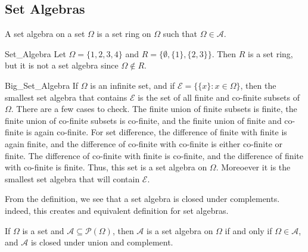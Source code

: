             \subsection{Set Algebras}
                \begin{definition}
                    A set algebra on a set $\Omega$ is a set ring
                    on $\Omega$ such that $\Omega\in\mathcal{A}$.
                \end{definition}
                \begin{lexample}{}{Set_Algebra}
                    Let $\Omega=\{1,2,3,4\}$ and
                    $R=\{\emptyset,\{1\},\{2,3\}\}$. Then $R$
                    is a set ring, but it is not a set algebra
                    since $\Omega\notin{R}$.
                \end{lexample}
                \begin{lexample}{}{Big_Set_Algebra}
                    If $\Omega$ is an infinite set, and if
                    $\mathcal{E}=\big\{\{x\}:x\in\Omega\big\}$, then
                    the smallest set algebra that contains $\mathcal{E}$
                    is the set of all finite and co-finite subsets of
                    $\Omega$. There are a few cases to check. The finite
                    union of finite subsets is finite, the finite union of
                    co-finite subsets is co-finite, and the finite union
                    of finite and co-finite is again co-finite. For set
                    difference, the difference of finite with finite is
                    again finite, and the difference of co-finite with
                    co-finite is either co-finite or finite. The
                    difference of co-finite with finite is co-finite,
                    and the difference of finite with co-finite is finite.
                    Thus, this set is a set algebra on $\Omega$. Moreoever
                    it is the smallest set algebra that will contain $\mathcal{E}$.
                \end{lexample}
                From the definition, we see that a set algebra
                is closed under complements. indeed, this creates
                and equivalent definition for set algebras.
                \begin{theorem}
                    If $\Omega$ is a set and
                    $\mathcal{A}\subseteq\mathcal{P}(\Omega)$,
                    then $\mathcal{A}$ is a set algebra on $\Omega$
                    if and only if $\Omega\in\mathcal{A}$, and
                    $\mathcal{A}$ is closed under union and
                    complement.
                \end{theorem}
